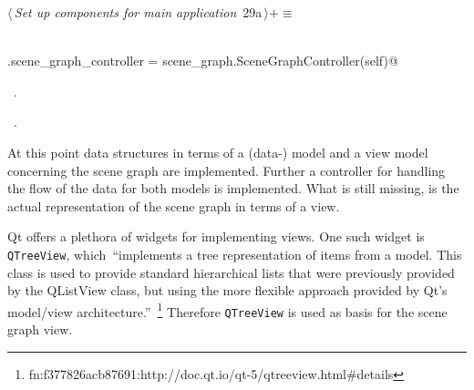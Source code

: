 \documentclass[
    a4paper,      %
    10pt,         %
    openright,    %
    notitlepage,  %
    parskip=half, %
]{scrreprt}       %
\theoremstyle{definition}                    %
\begin{document}
\begin{flushleft} \small
\begin{minipage}{\linewidth}\label{scrap26}\raggedright\small
{} $\langle\,${\itshape Set up components for main application}\nobreak\ {\footnotesize {29a}}$\,\rangle+\equiv$
\vspace{-1ex}
\begin{list}{}{} \item
\mbox{}\lstinline@@\\
\mbox{}\lstinline@self.scene_graph_controller = scene_graph.SceneGraphController(self)@\\
\mbox{}\lstinline@@{\NWsep}
\end{list}
\vspace{-1.5ex}
\footnotesize
\begin{list}{}{\setlength{\itemsep}{-\parsep}\setlength{\itemindent}{-\leftmargin}}
\item \NWtxtMacroDefBy\ .
\item \NWtxtMacroRefIn\ .

\item{}
\end{list}
\end{minipage}\vspace{4ex}
\end{flushleft}
At this point data structures in terms of a (data-) model and a view model
concerning the scene graph are implemented. Further a controller for handling
the flow of the data for both models is implemented. What is still missing, is
the actual representation of the scene graph in terms of a view.

Qt offers a plethora of widgets for implementing views. One such widget is
\verb+QTreeView+, which~\enquote{implements a tree representation of items from
a model. This class is used to provide standard hierarchical lists that were
previously provided by the QListView class, but using the more flexible approach
provided by Qt's model/view
architecture.}~\footnote{fn:f377826acb87691:http://doc.qt.io/qt-5/qtreeview.html\#details}
Therefore \verb+QTreeView+ is used as basis for the scene graph view.
\end{document}
